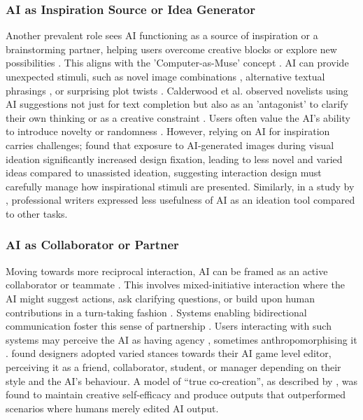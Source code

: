 \subsubsection{AI as Inspiration Source or Idea Generator}
Another prevalent role sees AI functioning as a source of inspiration or a brainstorming partner, helping users overcome creative blocks or explore new possibilities \citep{Calderwood2020-gg, Wan2023-he}. This aligns with the 'Computer-as-Muse' concept \citep{Lubart2005-zi}. AI can provide unexpected stimuli, such as novel image combinations \citep{Haase2024-yp, Kim2023-zq}, alternative textual phrasings \citep{Clark2018-yf, Doshi2023-dv}, or surprising plot twists \citep{Yang2022-vs, Ghajargar2022-af}. Calderwood et al. observed novelists using AI suggestions not just for text completion but also as an 'antagonist' to clarify their own thinking or as a creative constraint \citep{Calderwood2020-gg}. Users often value the AI's ability to introduce novelty or randomness \citep{Yang2022-vs, Bougueng-Tchemeube2023-nm}. However, relying on AI for inspiration carries challenges; \citet{Wadinambiarachchi2024-jn} found that exposure to AI-generated images during visual ideation significantly increased design fixation, leading to less novel and varied ideas compared to unassisted ideation, suggesting interaction design must carefully manage how inspirational stimuli are presented. Similarly, in a study by \citet{Chakrabarty2024-ov}, professional writers expressed less usefulness of AI as an ideation tool compared to other tasks.

\subsubsection{AI as Collaborator or Partner}
Moving towards more reciprocal interaction, AI can be framed as an active collaborator or teammate \citep{Lin2023-jd, Guzdial2019-cv}. This involves mixed-initiative interaction where the AI might suggest actions, ask clarifying questions, or build upon human contributions in a turn-taking fashion \citep{Lin2023-zq, Zhou2024-vp, Davis2016-te}. Systems enabling bidirectional communication foster this sense of partnership \citep{Rezwana2023-gj}. Users interacting with such systems may perceive the AI as having agency \citep{Lawton2023-tb, Yang2022-vs}, sometimes anthropomorphising it \citep{Oh2018-mu, Ghajargar2022-af}. \citet{Guzdial2019-gr} found designers adopted varied stances towards their AI game level editor, perceiving it as a friend, collaborator, student, or manager depending on their style and the AI's behaviour. A model of ``true co-creation'', as described by \citet{McGuire2024-im}, was found to maintain creative self-efficacy and produce outputs that outperformed scenarios where humans merely edited AI output.

